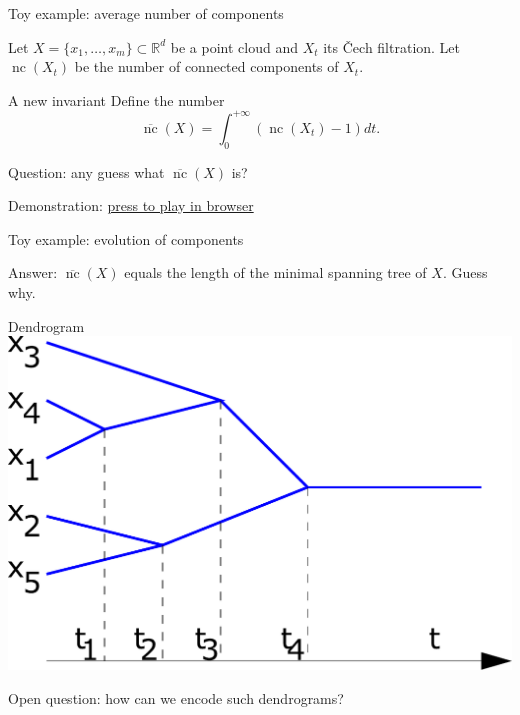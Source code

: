 \documentclass[10pt,xcolor={usenames}]{beamer}
\DeclareMathOperator{\nc}{nc}
\newcommand{\Ro}{\mathbb{R}}
\begin{document}
\begin{frame}{Toy example: average number of components}

Let $X=\{x_1,\ldots,x_m\}\subset \Ro^d$ be a point cloud and $X_t$ its \v{C}ech filtration. Let $\nc(X_t)$ be the number of connected components of $X_t$.

\begin{block}{A new invariant}
Define the number
\[
\overline{\nc}(X)=\int_{0}^{+\infty} (\nc(X_t)-1)dt.
\]
\end{block}
\pause

Question: any guess what $\overline{\nc}(X)$ is?

\begin{center}
Demonstration: \href{https://play.unity.com/mg/other/builds-4z-1}{press to play in browser}
\end{center}

\end{frame}

\begin{frame}{Toy example: evolution of components}

\begin{block}{Answer:}
$\overline{\nc}(X)$ equals the length of the minimal spanning tree of $X$. Guess why.
\end{block}

\pause

\begin{center}
  Dendrogram \includegraphics[scale = 0.3]{pictures/dendrogram.pdf}
\end{center}

Open question: how can we encode such dendrograms?

\end{frame}
\end{document}

